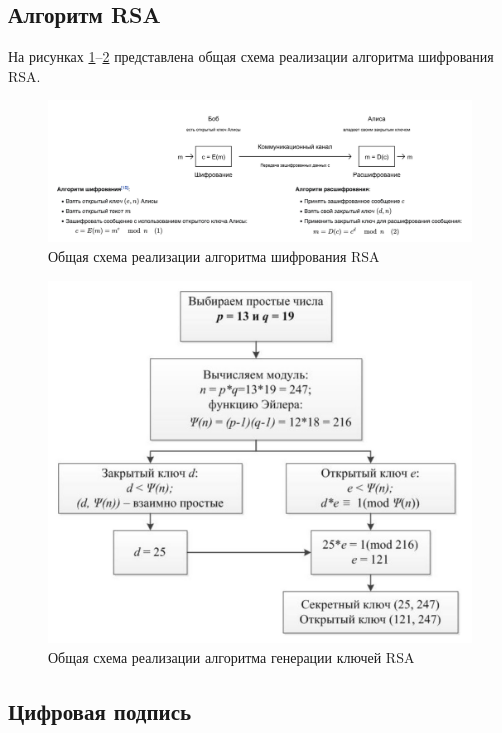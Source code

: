 \subsection{Алгоритм RSA}
На рисунках \ref{img:rsa}--\ref{img:rsa_keygen} представлена общая схема реализации алгоритма шифрования RSA.

\begin{figure}[!htb]\centering
	\includegraphics[width=1.0\linewidth]{../img/rsa.png}
	\caption{Общая схема реализации алгоритма шифрования RSA}
	\label{img:rsa}
\end{figure}

\newpage

\begin{figure}[!htb]\centering
	\includegraphics[width=1.0\linewidth]{../img/rsa_keygen.jpeg}
	\caption{Общая схема реализации алгоритма генерации ключей RSA}
	\label{img:rsa_keygen}
\end{figure}

\newpage

\subsection{Цифровая подпись}

